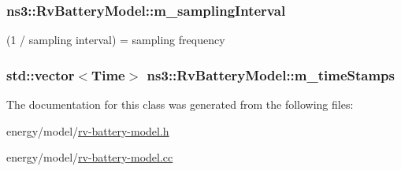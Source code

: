 \subsubsection[{\texorpdfstring{m\+\_\+sampling\+Interval}{m_samplingInterval}}]{ ns3\+::\+Rv\+Battery\+Model\+::m\+\_\+sampling\+Interval\hspace{0.3cm}{\ttfamily [private]}}\hypertarget{classns3_1_1RvBatteryModel_aab7b0edf6e33a0dc26cc633af6b6ac2e}{}\label{classns3_1_1RvBatteryModel_aab7b0edf6e33a0dc26cc633af6b6ac2e}
(1 / sampling interval) = sampling frequency 
\subsubsection[{\texorpdfstring{m\+\_\+time\+Stamps}{m_timeStamps}}]{\setlength{\rightskip}{0pt plus 5cm}std\+::vector$<${\bf Time}$>$ ns3\+::\+Rv\+Battery\+Model\+::m\+\_\+time\+Stamps\hspace{0.3cm}{\ttfamily [private]}}\hypertarget{classns3_1_1RvBatteryModel_a5748296171832703aa812b6e7389e7da}{}\label{classns3_1_1RvBatteryModel_a5748296171832703aa812b6e7389e7da}


The documentation for this class was generated from the following files\+:\begin{DoxyCompactItemize}
\item 
energy/model/\hyperlink{rv-battery-model_8h}{rv-\/battery-\/model.\+h}\item 
energy/model/\hyperlink{rv-battery-model_8cc}{rv-\/battery-\/model.\+cc}\end{DoxyCompactItemize}
